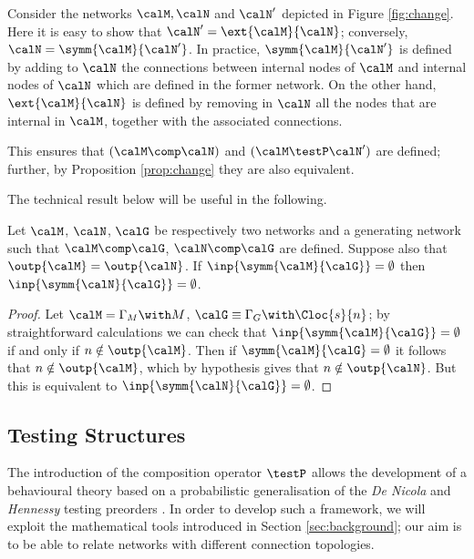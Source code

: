 \documentclass{LMCS}
\begin{document}
{\begin{exa}
Consider the networks $\calM, \calN$ and $\calN'$ depicted in 
Figure \ref{fig:change}. 
Here it is easy to show that $\calN' = \ext{\calM}{\calN}$; conversely, 
$\calN = \symm{\calM}{\calN'}$. In practice, $\symm{\calM}{\calN'}$ is 
defined by adding to $\calN$ the connections between internal nodes 
of $\calM$ and internal nodes of $\calN$ which are defined in the former network. 
On the other hand, $\ext{\calM}{\calN}$ is defined by removing in 
$\calN$ all the nodes that are internal in $\calM$, together with the 
associated connections. 

This ensures that $(\calM \comp \calN)$ and $(\calM \testP \calN')$ are 
defined; further, by Proposition \ref{prop:change} 
they are also equivalent.
\end{exa}

The technical result below will be useful in the following.
\begin{lem}
\label{lem:input.struct}
Let $\calM$, $\calN$, $\calG$ be respectively two networks and 
a generating network such that $\calM \comp \calG$, $\calN \comp \calG$ 
are defined. Suppose also that $\outp{\calM} = \outp{\calN}$.
If $\inp{\symm{\calM}{\calG}} = \emptyset$ then $\inp{\symm{\calN}{\calG}} = \emptyset$.
\end{lem}

\begin{proof}
Let $\calM = \Gamma_M \with M$, $\calG \equiv \Gamma_G \with \Cloc{s}{n}$; by straightforward calculations 
we can check that $\inp{\symm{\calM}{\calG}} = \emptyset$ 
if and only if $n \notin \outp{\calM}$. 
Then if $\symm{\calM}{\calG} = \emptyset$ it follows that $n \notin \outp{\calM}$, 
which by hypothesis gives that $n \notin \outp{\calN}$. But this is equivalent 
to $\inp{\symm{\calN}{\calG}} = \emptyset$.
\end{proof}




}
\subsection{Testing Structures}
\label{sec:ts}

The introduction of the composition operator $\testP$ allows the development of 
a behavioural theory based on a probabilistic 
generalisation of  the  \textit{De Nicola} and \textit{Hennessy}  testing preorders \cite{dnh}. In order to develop 
such a framework, we will exploit the mathematical tools introduced in Section \ref{sec:background}; our aim is 
 to be able to relate networks with different connection topologies.
\end{document}

